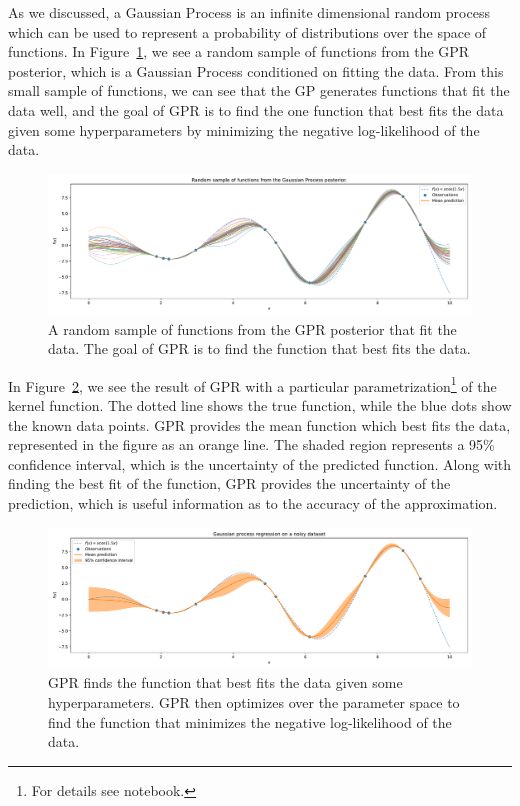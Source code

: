 \documentclass{article}
\begin{document}
As we discussed, a Gaussian Process is an infinite dimensional random process which can be used to represent a probability of distributions over the space of functions. In Figure~\ref{fig:gpr_sample}, we see a random sample of functions from the GPR posterior, which is a Gaussian Process conditioned on fitting the data. From this small sample of functions, we can see that the GP generates functions that fit the data well, and the goal of GPR is to find the one function that best fits the data given some hyperparameters by minimizing the negative log-likelihood of the data.

\begin{figure}[!htbp]
\centering
\includegraphics[width=0.7\linewidth]{files/gpr_sample-17851f5bdfaff3738b8cf28827639b0d.pdf}
\caption{A random sample of functions from the GPR posterior that fit the data. The goal of GPR is to find the function that best fits the data.}
\label{fig:gpr_sample}
\end{figure}

In Figure~\ref{fig:gpr}, we see the result of GPR with a particular parametrization\footnote{For details see notebook.} of the kernel function. The dotted line shows the true function, while the blue dots show the known data points. GPR provides the mean function which best fits the data, represented in the figure as an orange line. The shaded region represents a 95\% confidence interval, which is the uncertainty of the predicted function. Along with finding the best fit of the function, GPR provides the uncertainty of the prediction, which is useful information as to the accuracy of the approximation.

\begin{figure}[!htbp]
\centering
\includegraphics[width=0.7\linewidth]{files/gpr-752c36bb2492c4fd71d72e083cb8e5aa.pdf}
\caption{GPR finds the function that best fits the data given some hyperparameters. GPR then optimizes over the parameter space to find the function that minimizes the negative log-likelihood of the data.}
\label{fig:gpr}
\end{figure}
\end{document}
